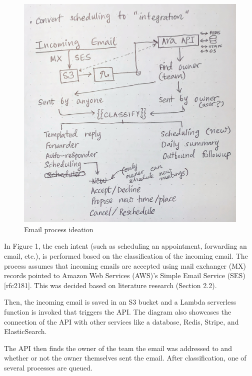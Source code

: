 \documentclass{article}
\begin{document}
\begin{figure}\centering
	\includegraphics[scale=0.097]{drawing-all-process.jpg}
	\caption{Email process ideation}
\end{figure}

In Figure 1, the each intent (such as scheduling an appointment, forwarding an email, etc.), is performed based on the classification of the incoming email. The process assumes that incoming emails are accepted using mail exchanger (MX) records pointed to Amazon Web Services (AWS)'s Simple Email Service (SES) [rfc2181]. This was decided based on literature research (Section 2.2).

Then, the incoming email is saved in an S3 bucket and a Lambda serverless function is invoked that triggers the API. The diagram also showcases the connection of the API with other services like a database, Redis, Stripe, and ElasticSearch.

The API then finds the owner of the team the email was addressed to and whether or not the owner themselves sent the email. After classification, one of several processes are queued.
\end{document}
